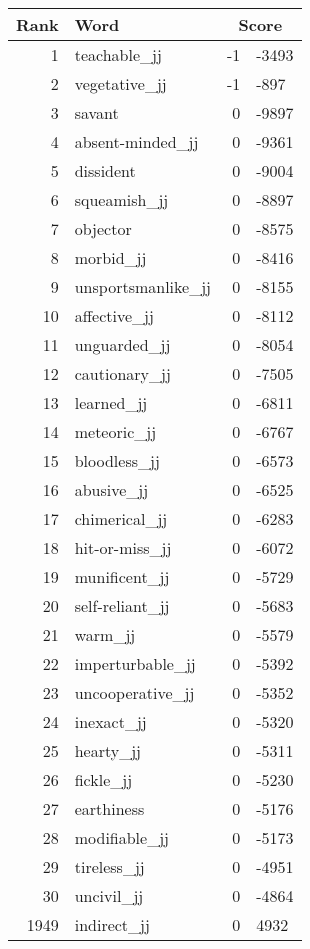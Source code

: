 \begin{longtable}[!htbp]{| rlr@{.}l |}
    \hline
    \textbf{Rank} & \textbf{Word} & \multicolumn{2}{c|}{\textbf{Score}} \\
    \hline
    \endhead
    1 & teachable\_jj & -1 & -3493 \\
    2 & vegetative\_jj & -1 & -897 \\
    3 & savant & 0 & -9897 \\
    4 & absent-minded\_jj & 0 & -9361 \\
    5 & dissident & 0 & -9004 \\
    6 & squeamish\_jj & 0 & -8897 \\
    7 & objector & 0 & -8575 \\
    8 & morbid\_jj & 0 & -8416 \\
    9 & unsportsmanlike\_jj & 0 & -8155 \\
    10 & affective\_jj & 0 & -8112 \\
    11 & unguarded\_jj & 0 & -8054 \\
    12 & cautionary\_jj & 0 & -7505 \\
    13 & learned\_jj & 0 & -6811 \\
    14 & meteoric\_jj & 0 & -6767 \\
    15 & bloodless\_jj & 0 & -6573 \\
    16 & abusive\_jj & 0 & -6525 \\
    17 & chimerical\_jj & 0 & -6283 \\
    18 & hit-or-miss\_jj & 0 & -6072 \\
    19 & munificent\_jj & 0 & -5729 \\
    20 & self-reliant\_jj & 0 & -5683 \\
    21 & warm\_jj & 0 & -5579 \\
    22 & imperturbable\_jj & 0 & -5392 \\
    23 & uncooperative\_jj & 0 & -5352 \\
    24 & inexact\_jj & 0 & -5320 \\
    25 & hearty\_jj & 0 & -5311 \\
    26 & fickle\_jj & 0 & -5230 \\
    27 & earthiness & 0 & -5176 \\
    28 & modifiable\_jj & 0 & -5173 \\
    29 & tireless\_jj & 0 & -4951 \\
    30 & uncivil\_jj & 0 & -4864 \\
    1949 & indirect\_jj & 0 & 4932 \\

\end{longtable}
